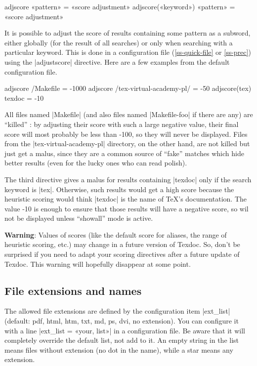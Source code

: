 \documentclass[a4paper, oneside]{scrartcl}
\makeatletter
\newenvironment{htcode}{%
  \SaveVerbatim[samepage, gobble=2]{verbmat}%
  }{%
  \endSaveVerbatim
  \par\medskip\noindent\hspace*{\parindent}%
  \BUseVerbatim{verbmat}%
  \par\medskip\@endpetrue}
\makeatother
\begin{document}
\begin{htcode}
  adjscore «pattern» = «score adjustment»
  adjscore(«keyword») «pattern» = «score adjustment»
\end{htcode}

It is possible to adjust the score of results containing some pattern as a
subword, either globally (for the result of all searches) or only when
searching with a particular keyword. This is done in a configuration file
(\ref{ss-quick-file} or \ref{ss-prec}) using the |adjustscore| directive. Here
are a few examples from the default configuration file.

\begin{htcode}
  adjscore /Makefile = -1000
  adjscore /tex-virtual-academy-pl/ = -50
  adjscore(tex) texdoc = -10
\end{htcode}

All files named |Makefile| (and also files named |Makefile-foo| if there are
any) are ``killed'' : by adjusting their score with such a large negative
value, their final score will most probably be less than -100, so they will
never be displayed. Files from the |tex-virtual-academy-pl| directory, on the
other hand, are not killed but just get a malus, since they are a common
source of ``fake'' matches which hide better results (even for the lucky ones
who can read polish).

The third directive gives a malus for results containing |texdoc| only if the
search keyword is |tex|. Otherwise, such results would get a high score
because the heuristic scoring would think |texdoc| is the name of \TeX's
documentation. The value -10 is enough to ensure that those results will have
a negative score, so wil not be displayed unless ``showall'' mode is active.

\textbf{Warning}: Values of scores (like the default score for aliases, the
range of heuristic scoring, etc.) may change in a future version of Texdoc.
So, don't be surprised if you need to adapt your scoring directives after a
future update of Texdoc.  This warning will hopefully disappear at some point.

\subsection{File extensions and names}\label{ss-ext}

The allowed file extensions are defined by the configuration item |ext_list|
(default: pdf, html, htm, txt, md, ps, dvi, no extension). You can configure it
with a line |ext_list = «your, list»| in a configuration file. Be aware
that it will completely override the default list, not add to it. An empty
string in the list means files without extension (no dot in the name), while a
star means any extension.
\end{document}
